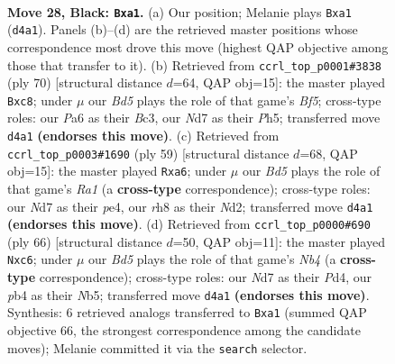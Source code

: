 \documentclass[11pt]{article}
\begin{document}
\clearpage

\begin{figure}[p]\centering
\begin{subfigure}{0.46\textwidth}\centering
\resizebox{\linewidth}{!}{%
\newchessgame
\chessboard[
  setfen={7R/1ppn1pk1/p7/P3P1p1/1PNbP1b1/8/8/R3KB2 b Q - 0 28},
  showmover=false,
  pgfstyle=straightmove, color=movearrow, markmove={d4-a1}
]}
\caption{}
\end{subfigure}\hfill
\begin{subfigure}{0.46\textwidth}\centering
\resizebox{\linewidth}{!}{%
\newchessgame
\chessboard[
  setfen={2r3k1/1p3pp1/1pb4p/2n2B1P/8/2B2P2/1P3KP1/8 w - - 0 36},
  showmover=false,
  pgfstyle=straightmove, color=movearrow, markmove={f5-c8}
]}
\caption{}
\end{subfigure}
\\[4pt]
\begin{subfigure}{0.46\textwidth}\centering
\resizebox{\linewidth}{!}{%
\newchessgame
\chessboard[
  setfen={r5k1/5pp1/R7/2N1p2p/4Pb1P/2P2P2/2Pn1K2/4B3 b - - 0 30},
  showmover=false,
  pgfstyle=straightmove, color=movearrow, markmove={a8-a6}
]}
\caption{}
\end{subfigure}\hfill
\begin{subfigure}{0.46\textwidth}\centering
\resizebox{\linewidth}{!}{%
\newchessgame
\chessboard[
  setfen={6k1/pn1nB1b1/1pr3pp/1N6/PNPP2P1/5K2/8/8 w - - 0 34},
  showmover=false,
  pgfstyle=straightmove, color=movearrow, markmove={b4-c6}
]}
\caption{}
\end{subfigure}
\caption{\textbf{Move 28, Black: \texttt{Bxa1}.} (a) Our position; Melanie plays \texttt{Bxa1} (\texttt{d4a1}). Panels (b)--(d) are the retrieved master positions whose correspondence most drove this move (highest QAP objective among those that transfer to it). (b) Retrieved from \texttt{ccrl\_top\_p0001\#3838} (ply 70) [structural distance $d$=64, QAP obj=15]: the master played \texttt{Bxc8}; under $\mu$ our \emph{Bd5} plays the role of that game's \emph{Bf5}; cross-type roles: our \emph{P}a6 as their \emph{B}c3, our \emph{N}d7 as their \emph{P}h5; transferred move \texttt{d4a1} \textbf{(endorses this move)}. (c) Retrieved from \texttt{ccrl\_top\_p0003\#1690} (ply 59) [structural distance $d$=68, QAP obj=15]: the master played \texttt{Rxa6}; under $\mu$ our \emph{Bd5} plays the role of that game's \emph{Ra1} (a \textbf{cross-type} correspondence); cross-type roles: our \emph{N}d7 as their \emph{p}e4, our \emph{r}h8 as their \emph{N}d2; transferred move \texttt{d4a1} \textbf{(endorses this move)}. (d) Retrieved from \texttt{ccrl\_top\_p0000\#690} (ply 66) [structural distance $d$=50, QAP obj=11]: the master played \texttt{Nxc6}; under $\mu$ our \emph{Bd5} plays the role of that game's \emph{Nb4} (a \textbf{cross-type} correspondence); cross-type roles: our \emph{N}d7 as their \emph{P}d4, our \emph{p}b4 as their \emph{N}b5; transferred move \texttt{d4a1} \textbf{(endorses this move)}. Synthesis: 6 retrieved analogs transferred to \texttt{Bxa1} (summed QAP objective 66, the strongest correspondence among the candidate moves); Melanie committed it via the \texttt{search} selector.}
\label{fig:thought-m55}
\end{figure}
\end{document}
